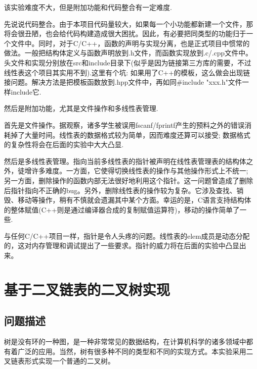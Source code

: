\documentclass[supercite]{Experimental_Report}
\theoremstyle{definition}
\begin{document}
该实验难度不大，但是附加功能和代码整合有一定难度.

先说说代码整合。由于本项目代码量较大，如果每一个小功能都新建一个文件，那将会很丑陋，也会给代码构建造成很大困扰。因此，有必要把同类型的功能归于一个文件中。同时，对于C/C++，函数的声明与实现分离，也是正式项目中惯常的做法。一般把结构体定义与函数声明放到.h文件，而函数实现放到.c/.cpp文件中。头文件和实现分别放在src和include目录下(似乎是因为链接第三方库的需要，不过线性表这个项目其实用不到).这里有个坑: 如果用了C++的模板，这么做会出现链接问题。解决方法是把模板函数放到.hpp文件中，再如同\#include "xxx.h"文件一样include它.

然后是附加功能，尤其是文件操作和多线性表管理.

首先是文件操作。据观察，诸多学生被误用fscanf/fprintf产生的预料之外的错误消耗掉了大量时间。线性表的数据格式较为简单，因而难度还算可以接受; 数据格式的复杂性将会在后面的实验中大大凸显.

然后是多线性表管理。指向当前多线性表的指针被声明在线性表管理表的结构体之外，徒增许多难度。一方面，它使得切换线性表的操作与其他操作形式上不统一; 另一方面，删除操作的函数内部无法很好地利用这个指针。这一问题曾造成了删除后指针指向不正确的bug。另外，删除线性表的操作较为复杂。它涉及查找、销毁、移动等操作，稍有不慎就会遗漏其中某个方面。幸运的是，C语言支持结构体的整体赋值(C++则是通过编译器合成的复制赋值运算符\cite{CopyAssignmentCppReference})，移动的操作简单了一些.

与任何C/C++项目一样，指针是令人头疼的问题。线性表的elem成员是动态分配的，这对内存管理和调试提出了一些要求。指针的威力将在后面的实验中凸显出来。

\newpage


\section{基于二叉链表的二叉树实现}

\subsection{问题描述}

树是没有环的一种图，是一种非常常见的数据结构，在计算机科学的诸多领域中都有着广泛的应用。当然，树有很多种不同的类型和不同的实现方式。本实验采用二叉链表形式实现一个普通的二叉树。
\end{document}
